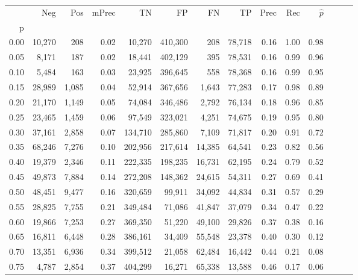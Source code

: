 \begin{tabular}{rrrrrrrrrrrrrr}
\toprule
{} &     Neg &    Pos & mPrec &       TN &       FP &      FN &      TP &  Prec &   Rec & $\hat{p}$ \\
p    &         &        &       &          &          &         &         &       &       &           \\
\midrule
0.00 &  10,270 &    208 &  0.02 &   10,270 &  410,300 &     208 &  78,718 &  0.16 &  1.00 &      0.98 \\
0.05 &   8,171 &    187 &  0.02 &   18,441 &  402,129 &     395 &  78,531 &  0.16 &  0.99 &      0.96 \\
0.10 &   5,484 &    163 &  0.03 &   23,925 &  396,645 &     558 &  78,368 &  0.16 &  0.99 &      0.95 \\
0.15 &  28,989 &  1,085 &  0.04 &   52,914 &  367,656 &   1,643 &  77,283 &  0.17 &  0.98 &      0.89 \\
0.20 &  21,170 &  1,149 &  0.05 &   74,084 &  346,486 &   2,792 &  76,134 &  0.18 &  0.96 &      0.85 \\
0.25 &  23,465 &  1,459 &  0.06 &   97,549 &  323,021 &   4,251 &  74,675 &  0.19 &  0.95 &      0.80 \\
0.30 &  37,161 &  2,858 &  0.07 &  134,710 &  285,860 &   7,109 &  71,817 &  0.20 &  0.91 &      0.72 \\
0.35 &  68,246 &  7,276 &  0.10 &  202,956 &  217,614 &  14,385 &  64,541 &  0.23 &  0.82 &      0.56 \\
0.40 &  19,379 &  2,346 &  0.11 &  222,335 &  198,235 &  16,731 &  62,195 &  0.24 &  0.79 &      0.52 \\
0.45 &  49,873 &  7,884 &  0.14 &  272,208 &  148,362 &  24,615 &  54,311 &  0.27 &  0.69 &      0.41 \\
0.50 &  48,451 &  9,477 &  0.16 &  320,659 &   99,911 &  34,092 &  44,834 &  0.31 &  0.57 &      0.29 \\
0.55 &  28,825 &  7,755 &  0.21 &  349,484 &   71,086 &  41,847 &  37,079 &  0.34 &  0.47 &      0.22 \\
0.60 &  19,866 &  7,253 &  0.27 &  369,350 &   51,220 &  49,100 &  29,826 &  0.37 &  0.38 &      0.16 \\
0.65 &  16,811 &  6,448 &  0.28 &  386,161 &   34,409 &  55,548 &  23,378 &  0.40 &  0.30 &      0.12 \\
0.70 &  13,351 &  6,936 &  0.34 &  399,512 &   21,058 &  62,484 &  16,442 &  0.44 &  0.21 &      0.08 \\
0.75 &   4,787 &  2,854 &  0.37 &  404,299 &   16,271 &  65,338 &  13,588 &  0.46 &  0.17 &      0.06 \\

\end{tabular}
